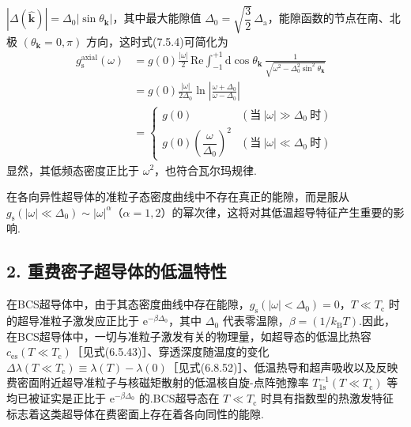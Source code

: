 $\left|\Delta(\hat{\boldsymbol{k}})\right|=\Delta_{0}\left|\sin\theta_{\boldsymbol{k}}\right|$，其中最大能隙值 $\Delta_{0}=\sqrt{\dfrac{3}{2}}\,\Delta_{\mathrm{a}}$，能隙函数的节点在南、北极 $\left(\theta_{\boldsymbol{k}}=0,\pi\right)$ 方向，这时式(7.5.4)可简化为
\begin{equation}
\begin{aligned}
  g_{\mathrm{s}}^{\mathrm{axial}}(\omega)&=g(0)\frac{\left|\omega\right|}{2}\,\mathrm{Re}
  \int_{-1}^{+1}\mathrm{d}\cos\theta_{\boldsymbol{k}}\,
  \frac{1}{\sqrt{\omega^{2}-\Delta_{0}^{2}\sin^{2}\theta_{\boldsymbol{k}}}}\\
  &=g(0)\frac{\left|\omega\right|}{2\Delta_{0}}\ln\left|\frac{\omega+\Delta_{0}}{\omega-\Delta_{0}}\right|\\
  &=\begin{cases}
    g(0) & \left(\text{当}\ \left|\omega\right|\gg\Delta_{0}\ \text{时}\right)\\[0.5em]
    g(0)\left(\dfrac{\omega}{\Delta_{0}}\right)^{2} & \left(\text{当}\ \left|\omega\right|\ll\Delta_{0}\ \text{时}\right)
  \end{cases}
\end{aligned}
\end{equation}
显然，其低频态密度正比于 $\omega^{2}$，也符合瓦尔玛规律.

在各向异性超导体的准粒子态密度曲线中不存在真正的能隙，而是服从 $g_{\mathrm{s}}\left(\left|\omega\right|\ll\Delta_{0}\right)\sim\left|\omega\right|^{\alpha}$（$\alpha=1,2$）的幂次律，这将对其低温超导特征产生重要的影响.

\subsection*{2. 重费密子超导体的低温特性}

在BCS超导体中，由于其态密度曲线中存在能隙，$g_{\mathrm{s}}\left(\left|\omega\right|<\Delta_{0}\right)=0$，$T\ll T_{\mathrm{c}}$ 时的超导准粒子激发应正比于 $\mathrm{e}^{-\beta\Delta_{0}}$，其中 $\Delta_{0}$ 代表零温隙，$\beta=\left(1/k_{\mathrm{B}}T\right)$.因此，在BCS超导体中，一切与准粒子激发有关的物理量，如超导态的低温比热容 $c_{\mathrm{es}}\left(T\ll T_{\mathrm{c}}\right)$［见式(6.5.43)］、穿透深度随温度的变化 $\Delta\lambda\left(T\ll T_{\mathrm{c}}\right)\equiv\lambda(T)-\lambda(0)$［见式(6.8.52)］、低温热导和超声吸收以及反映费密面附近超导准粒子与核磁矩散射的低温核自旋-点阵弛豫率 $T_{1\mathrm{s}}^{-1}\left(T\ll T_{\mathrm{c}}\right)$ 等均已被证实是正比于 $\mathrm{e}^{-\beta\Delta_{0}}$ 的.BCS超导态在 $T\ll T_{\mathrm{c}}$ 时具有指数型的热激发特征标志着这类超导体在费密面上存在着各向同性的能隙.

